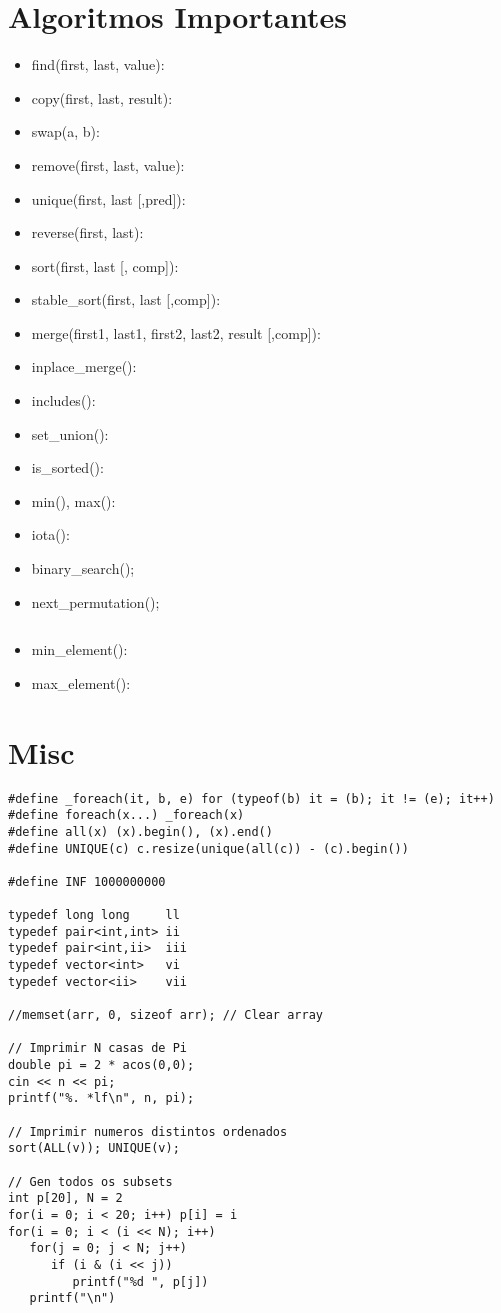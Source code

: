 \documentclass{article}
\begin{document}
\section{Algoritmos Importantes}
\begin{itemize}
   \item find(first, last, value):
   \item copy(first, last, result):
   \item swap(a, b):
   \item remove(first, last, value):
   \item unique(first, last [,pred]):
   \item reverse(first, last):
   \item sort(first, last [, comp]):
   \item stable\_sort(first, last [,comp]):
   \item merge(first1, last1, first2, last2, result [,comp]):
   \item inplace\_merge():
   \item includes():
   \item set\_union():
   \item is\_sorted():
   \item min(), max():
   \item iota():
   \item binary\_search();
   \item next\_permutation();
      \begin{lstlisting}
      \end{lstlisting}
   \item min\_element():
   \item max\_element():
\end{itemize}

\section{Misc}

\begin{lstlisting}
#define _foreach(it, b, e) for (typeof(b) it = (b); it != (e); it++) 
#define foreach(x...) _foreach(x)
#define all(x) (x).begin(), (x).end()
#define UNIQUE(c) c.resize(unique(all(c)) - (c).begin())

#define INF 1000000000

typedef long long     ll
typedef pair<int,int> ii
typedef pair<int,ii>  iii
typedef vector<int>   vi
typedef vector<ii>    vii

//memset(arr, 0, sizeof arr); // Clear array

// Imprimir N casas de Pi
double pi = 2 * acos(0,0);
cin << n << pi;
printf("%. *lf\n", n, pi);

// Imprimir numeros distintos ordenados
sort(ALL(v)); UNIQUE(v);

// Gen todos os subsets
int p[20], N = 2
for(i = 0; i < 20; i++) p[i] = i
for(i = 0; i < (i << N); i++)
   for(j = 0; j < N; j++)
      if (i & (i << j))
         printf("%d ", p[j])
   printf("\n")


\end{lstlisting}
\end{document}

